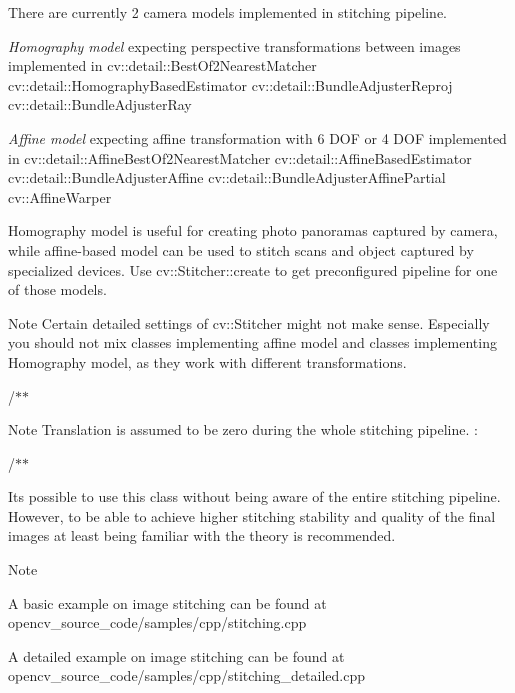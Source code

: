 There are currently 2 camera models implemented in stitching pipeline. 


\begin{DoxyItemize}
\item {\itshape Homography model} expecting perspective transformations between images implemented in cv\+::detail\+::\+Best\+Of2\+Nearest\+Matcher cv\+::detail\+::\+Homography\+Based\+Estimator cv\+::detail\+::\+Bundle\+Adjuster\+Reproj cv\+::detail\+::\+Bundle\+Adjuster\+Ray
\item {\itshape Affine model} expecting affine transformation with 6 D\+OF or 4 D\+OF implemented in cv\+::detail\+::\+Affine\+Best\+Of2\+Nearest\+Matcher cv\+::detail\+::\+Affine\+Based\+Estimator cv\+::detail\+::\+Bundle\+Adjuster\+Affine cv\+::detail\+::\+Bundle\+Adjuster\+Affine\+Partial cv\+::\+Affine\+Warper 
\end{DoxyItemize}

Homography model is useful for creating photo panoramas captured by camera, while affine-\/based model can be used to stitch scans and object captured by specialized devices. Use cv\+::\+Stitcher\+::create to get preconfigured pipeline for one of those models. 

\begin{DoxyNote}{Note}
Certain detailed settings of cv\+::\+Stitcher might not make sense. Especially you should not mix classes implementing affine model and classes implementing Homography model, as they work with different transformations. 
\end{DoxyNote}


/$\ast$$\ast$

\begin{DoxyNote}{Note}
Translation is assumed to be zero during the whole stitching pipeline. \+:
\end{DoxyNote}


/$\ast$$\ast$

It\textquotesingle{}s possible to use this class without being aware of the entire stitching pipeline. However, to be able to achieve higher stitching stability and quality of the final images at least being familiar with the theory is recommended. 

\begin{DoxyNote}{Note}

\begin{DoxyItemize}
\item A basic example on image stitching can be found at opencv\+\_\+source\+\_\+code/samples/cpp/stitching.\+cpp
\begin{DoxyItemize}
\item A detailed example on image stitching can be found at opencv\+\_\+source\+\_\+code/samples/cpp/stitching\+\_\+detailed.\+cpp 
\end{DoxyItemize}
\end{DoxyItemize}
\end{DoxyNote}
